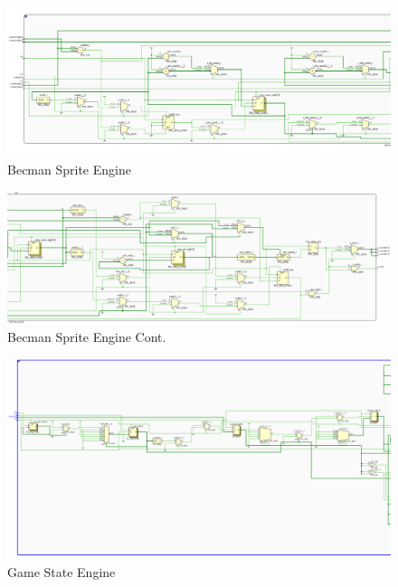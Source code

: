\documentclass[12pt]{article}
\begin{document}
\begin{figure}
    \includegraphics[width=\textwidth]{BecmanSpritePt1.png}
    \caption{Becman Sprite Engine}
    \label{fig:LandscapeFigure}
\end{figure}

\begin{figure}
    \includegraphics[width=\textwidth]{BecmanSpritePt2.png}
    \caption{Becman Sprite Engine Cont.}
    \label{fig:LandscapeFigure}
\end{figure}

\begin{figure}
    \includegraphics[width=\textwidth]{GameStatePt1.png}
    \caption{Game State Engine}
    \label{fig:LandscapeFigure}
\end{figure}
\end{document}
